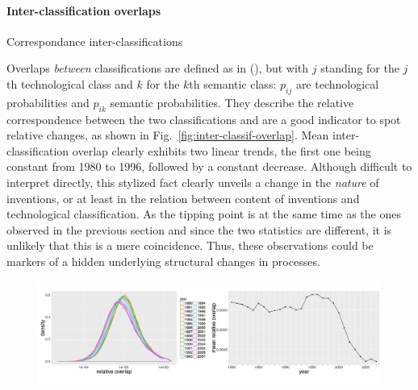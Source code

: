 \paragraph{Inter-classification overlaps}{Correspondance inter-classifications}

Overlaps \emph{between} classifications are defined as in (), but with $j$ standing for the $j$th technological class and $k$ for the $k$th semantic class: $p_{ij}$ are technological probabilities and $p_{ik}$ semantic probabilities. They describe the relative correspondence between the two classifications and are a good indicator to spot relative changes, as shown in Fig.~\ref{fig:inter-classif-overlap}. Mean inter-classification overlap clearly exhibits two linear trends, the first one being constant from 1980 to 1996, followed by a constant decrease. Although difficult to interpret directly, this stylized fact clearly unveils a change in the \emph{nature} of inventions, or at least in the relation between content of inventions and technological classification. As the tipping point is at the same time as the ones observed in the previous section and since the two statistics are different, it is unlikely that this is a mere coincidence. Thus, these observations could be markers of a hidden underlying structural changes in processes. 




\begin{figure}[!ht]
\includegraphics[width=\linewidth]{Figures/Final/C-patentsmining-inter-classif-overlap.jpg}
\label{fig:patentsmining:inter-classif-overlap}
\end{figure}





